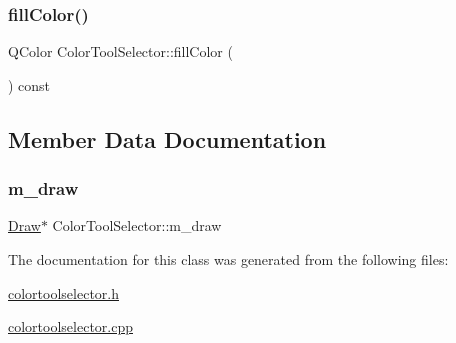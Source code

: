 \subsubsection{\texorpdfstring{fill\+Color()}{fillColor()}}
{\footnotesize\ttfamily Q\+Color Color\+Tool\+Selector\+::fill\+Color (\begin{DoxyParamCaption}{ }\end{DoxyParamCaption}) const}



\subsection{Member Data Documentation}
\mbox{\label{class_color_tool_selector_af2464293935f4a53d1cbcc3b0596823d}} 
\subsubsection{\texorpdfstring{m\+\_\+draw}{m\_draw}}
{\footnotesize\ttfamily \hyperlink{class_draw}{Draw}$\ast$ Color\+Tool\+Selector\+::m\+\_\+draw\hspace{0.3cm}{\ttfamily [protected]}}



The documentation for this class was generated from the following files\+:\begin{DoxyCompactItemize}
\item 
\hyperlink{colortoolselector_8h}{colortoolselector.\+h}\item 
\hyperlink{colortoolselector_8cpp}{colortoolselector.\+cpp}\end{DoxyCompactItemize}
